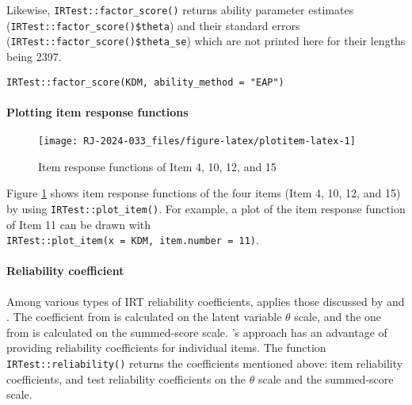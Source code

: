 Likewise, \texttt{IRTest::factor\_score()} returns ability parameter estimates
(\texttt{IRTest::factor\_score()\$theta}) and their standard errors
(\texttt{IRTest::factor\_score()\$theta\_se}) which are not printed here for their lengths being 2397.

\begin{verbatim}
IRTest::factor_score(KDM, ability_method = "EAP")
\end{verbatim}

\hypertarget{plotting-item-response-functions}{%
\paragraph{Plotting item response functions}\label{plotting-item-response-functions}}

\begin{figure}[H]

{\centering \texttt{[image: RJ-2024-033\_files/figure-latex/plotitem-latex-1]} 

}

\caption{Item response functions of Item 4, 10, 12, and 15}\label{fig:plotitem-latex}
\end{figure}

Figure
\ref{fig:plotitem-latex}
shows item response functions of the four items (Item 4, 10, 12, and 15) by using \texttt{IRTest::plot\_item()}.
For example, a plot of the item response function of Item 11 can be drawn with
\texttt{IRTest::plot\_item(x\ =\ KDM,\ item.number\ =\ 11)}.

\hypertarget{reliability-coefficient}{%
\paragraph{Reliability coefficient}\label{reliability-coefficient}}

Among various types of IRT reliability coefficients, 
applies those discussed by \citet{Green:1984} and \citet{May+Nicewander:1994}. The
coefficient from \citet{Green:1984} is calculated on the latent variable
\(\theta\) scale, and the one from \citet{May+Nicewander:1994} is calculated on
the summed-score scale. \citet{May+Nicewander:1994}'s approach has an advantage
of providing reliability coefficients for individual items. The
function \texttt{IRTest::reliability()} returns the coefficients mentioned
above: item reliability coefficients, and test reliability coefficients
on the \(\theta\) scale and the summed-score scale.

